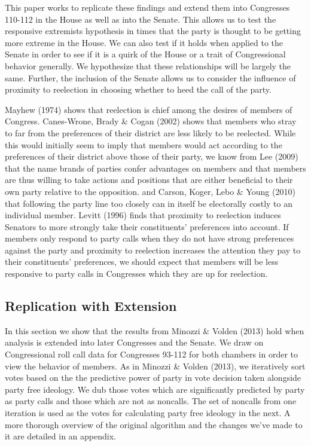 \documentclass[12pt]{article}
\begin{document}
This paper works to replicate these findings and extend them into Congresses 110-112 in the House as well as into the Senate. This allows us to test the responsive extremists hypothesis in times that the party is thought to be getting more extreme in the House. We can also test if it holds when applied to the Senate in order to see if it is a quirk of the House or a trait of Congressional behavior generally. We hypothesize that these relationships will be largely the same. Further, the inclusion of the Senate allows us to consider the influence of proximity to reelection in choosing whether to heed the call of the party.

Mayhew (1974) shows that reelection is chief among the desires of members of Congress. Canes-Wrone, Brady \& Cogan (2002) shows that members who stray to far from the preferences of their district are less likely to be reelected. While this would initially seem to imply that members would act according to the preferences of their district above those of their party, we know from Lee (2009) that the name brands of parties confer advantages on members and that members are thus willing to take actions and positions that are either beneficial to their own party relative to the opposition. and Carson, Koger, Lebo \& Young (2010) that following the party line too closely can in itself be electorally costly to an individual member. Levitt (1996) finds that proximity to reelection induces Senators to more strongly take their constituents' preferences into account. If members only respond to party calls when they do not have strong preferences against the party and proximity to reelection increases the attention they pay to their constituents' preferences, we should expect that members will be less responsive to party calls in Congresses which they are up for reelection.

\subsection{Replication with Extension}

In this section we show that the results from Minozzi \& Volden (2013) hold when analysis is extended into later Congresses and the Senate. We draw on Congressional roll call data for Congresses 93-112 for both chambers in order to view the behavior of members. As in Minozzi \& Volden (2013), we iteratively sort votes based on the the predictive power of party in vote decision taken alongside party free ideology. We dub those votes which are significantly predicted by party as party calls and those which are not as noncalls. The set of noncalls from one iteration is used as the votes for calculating party free ideology in the next. A more thorough overview of the original algorithm and the changes we've made to it are detailed in an appendix.
\end{document}
